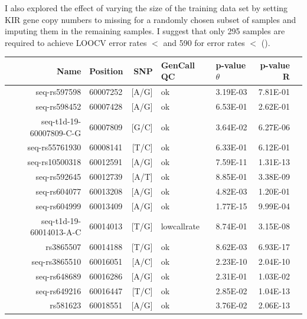 I also explored the effect of varying the size of the training data set by setting KIR gene copy numbers to missing for a randomly chosen subset of samples and imputing them in the remaining samples.
I suggest that only 295 samples are required to achieve \gls{LOOCV} error rates $<$  and 590 for error rates $<$  ().


\begin{table}[h]
\begin{center}
\footnotesize
\begin{tabular}{rlrllrr}
  \hline
Name                    & Position & SNP   & GenCall QC  & p-value $\theta$  & p-value R \\
  \hline
seq-rs597598            & 60007252 & [A/G] & ok          & 3.19E-03 & 7.81E-01 \\
seq-rs598452            & 60007428 & [A/G] & ok          & 6.53E-01 & 2.62E-01 \\
\rowcolor{LightCyan}
seq-t1d-19-60007809-C-G & 60007809 & [G/C] & ok          & 3.64E-02 & 6.27E-06 \\
seq-rs55761930          & 60008141 & [T/C] & ok          & 6.33E-01 & 6.12E-01 \\
\rowcolor{LightCyan}
seq-rs10500318          & 60012591 & [A/G] & ok          & 7.59E-11 & 1.31E-13 \\
\rowcolor{LightRed}
seq-rs592645            & 60012739 & [A/T] & ok          & 8.85E-01 & 3.38E-09 \\
seq-rs604077            & 60013208 & [A/G] & ok          & 4.82E-03 & 1.20E-01 \\
\rowcolor{LightCyan}
seq-rs604999            & 60013409 & [A/G] & ok          & 1.77E-15 & 9.99E-04 \\
\rowcolor{LightCyan}
seq-t1d-19-60014013-A-C & 60014013 & [T/G] & lowcallrate & 8.74E-01 & 3.15E-08 \\
\rowcolor{LightCyan}
rs3865507               & 60014188 & [T/G] & ok          & 8.62E-03 & 6.93E-17 \\
\rowcolor{LightCyan}
seq-rs3865510           & 60016051 & [A/C] & ok          & 2.23E-10 & 2.04E-10 \\
seq-rs648689            & 60016286 & [A/G] & ok          & 2.31E-01 & 1.03E-02 \\
\rowcolor{LightCyan}
seq-rs649216            & 60016447 & [T/C] & ok          & 2.85E-02 & 1.04E-13 \\
\rowcolor{LightCyan}
rs581623                & 60018551 & [A/G] & ok          & 3.76E-02 & 2.06E-13 \\

\end{tabular}
\end{center}
\end{table}
